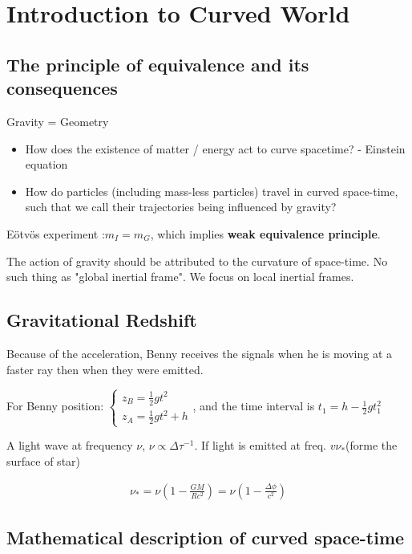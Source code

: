 \newpage

\mainmatter
{}
\chapter{Introduction to Curved World}

\newpage

\section{The principle of equivalence and its consequences}

Gravity = Geometry
\begin{itemize}
    \item How does the existence of matter / energy act to curve spacetime? - Einstein equation
    \item How do particles (including mass-less particles) travel in curved space-time, such that we call their trajectories being influenced by gravity?
\end{itemize}

Eötvös experiment :$m_{I}=m_{G}$, which implies \textbf{weak equivalence principle}.



The action of gravity should be attributed to the curvature of space-time. No such thing as "global inertial frame". We focus on local inertial frames.

\section{Gravitational Redshift}

Because of the acceleration, Benny receives the signals when he is moving at a faster ray then when they were emitted.

For Benny position: $\begin{cases}z_{B}=\frac{1}{2}gt^{2}\\z_{A}=\frac{1}{2}gt^{2}+h\end{cases}$, and the time interval is $t_{1}=h-\frac{1}{2}gt_{1}^2$ 


A light wave at frequency $\nu$, $\nu \varpropto \Delta \tau^{-1}$. If light is emitted at freq. $v\nu_{*}$(forme the surface of star)

\begin{align}
    \nu_{*}=\nu(1-\frac{GM}{Rc^{2}})=\nu(1-\frac{\Delta \phi}{c^{2}})
\end{align}

\section{Mathematical description of curved space-time}


